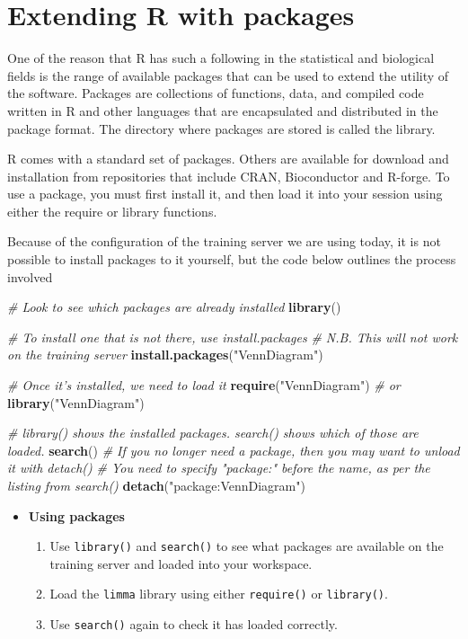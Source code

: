 \documentclass[a4paper]{book}
\newenvironment{Shaded}{\begin{snugshade}}{\end{snugshade}}
\newcommand{\KeywordTok}[1]{\textcolor[rgb]{0.13,0.29,0.53}{\textbf{{#1}}}}
\newcommand{\StringTok}[1]{\textcolor[rgb]{0.31,0.60,0.02}{{#1}}}
\newcommand{\CommentTok}[1]{\textcolor[rgb]{0.56,0.35,0.01}{\textit{{#1}}}}
\newcommand{\NormalTok}[1]{{#1}}
\renewenvironment{Shaded}
{\vspace{1.5em}\begin{leftbar}\begin{snugshade}}
{\end{snugshade}\end{leftbar}\vspace{3pt}}
\newenvironment{rmdblock}[1]
  {\vspace{1.5em}\begin{shaded*}
  \begin{itemize}
  \renewcommand{\labelitemi}{
    \raisebox{-.7\height}[0pt][0pt]{
      {\setkeys{Gin}{width=3em,keepaspectratio}\texttt{[image: images/\#1]}}
    }
  }
  \item
  }
  {
  \end{itemize}
  \end{shaded*}
  }
\newenvironment{rmdexercise}
  {\begin{rmdblock}{exercise}}
  {\end{rmdblock}}
\begin{document}
\section{Extending R with packages}\label{extending-r-with-packages}

One of the reason that R has such a following in the statistical and
biological fields is the range of available packages that can be used to
extend the utility of the software. Packages are collections of
functions, data, and compiled code written in R and other languages that
are encapsulated and distributed in the package format. The directory
where packages are stored is called the library.

R comes with a standard set of packages. Others are available for
download and installation from repositories that include CRAN,
Bioconductor and R-forge. To use a package, you must first install it,
and then load it into your session using either the require or library
functions.

Because of the configuration of the training server we are using today,
it is not possible to install packages to it yourself, but the code
below outlines the process involved

\begin{Shaded}
\begin{Highlighting}[]
\CommentTok{# Look to see which packages are already installed}
\KeywordTok{library}\NormalTok{()}

\CommentTok{# To install one that is not there, use install.packages}
\CommentTok{# N.B. This will not work on the training server}
\KeywordTok{install.packages}\NormalTok{(}\StringTok{"VennDiagram"}\NormalTok{)}

\CommentTok{# Once it's installed, we need to load it}
\KeywordTok{require}\NormalTok{(}\StringTok{"VennDiagram"}\NormalTok{)}
\CommentTok{# or}
\KeywordTok{library}\NormalTok{(}\StringTok{"VennDiagram"}\NormalTok{)}

\CommentTok{# library() shows the installed packages. search() shows which of those are loaded.}
\KeywordTok{search}\NormalTok{()}
\CommentTok{# If you no longer need a package, then you may want to unload it with detach()}
\CommentTok{# You need to specify "package:" before the name, as per the listing from search()}
\KeywordTok{detach}\NormalTok{(}\StringTok{"package:VennDiagram"}\NormalTok{)}
\end{Highlighting}
\end{Shaded}

\begin{rmdexercise}
\textbf{Using packages}

\begin{enumerate}
\def\labelenumi{\arabic{enumi}.}
\item
  Use \texttt{library()} and \texttt{search()} to see what packages are
  available on the training server and loaded into your workspace.
\item
  Load the \texttt{limma} library using either \texttt{require()} or
  \texttt{library()}.
\item
  Use \texttt{search()} again to check it has loaded correctly.
\end{enumerate}
\end{rmdexercise}
\end{document}
